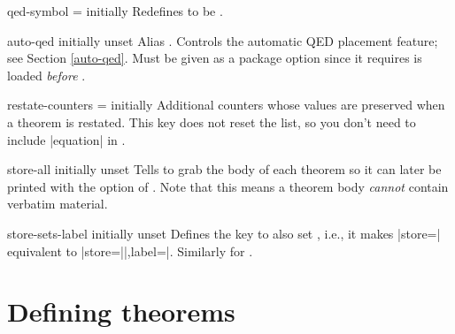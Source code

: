 \documentclass{ltxdoc}
\newcommand{\ttbraces}[1]{\braces{\texttt{#1}}}
\begin{document}
\begin{docKey}{qed-symbol}
  {=}
  {initially }
Redefines  to be .
\end{docKey}

\begin{docKey}{auto-qed}
  {}
  {initially unset}
Alias .
Controls the automatic QED placement feature; see Section \ref{auto-qed}.
Must be given as a package option since it requires  is loaded \emph{before} .
\end{docKey}

\begin{docKey}{restate-counters}
  {=}
  {initially \ttbraces{equation}}
Additional counters whose values are preserved when a theorem is restated.
This key does not reset the list, so you don't need to include |equation| in .
\end{docKey}

\begin{docKey}{store-all}
  {}
  {initially unset}
Tells  to grab the body of each theorem so it can later be printed with the  option of .
Note that this means a theorem body \emph{cannot} contain verbatim material.
\end{docKey}

\begin{docKey}{store-sets-label}
  {}
  {initially unset}
Defines the  key to also set , i.e., it makes |store=| equivalent to |store=||,label=|.
Similarly for .
\end{docKey}

\section{Defining theorems}
\end{document}
